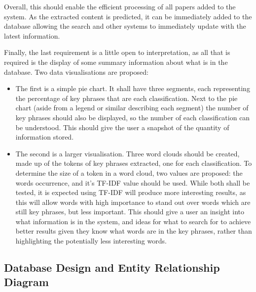 Overall, this should enable the efficient processing of all papers added to the system. As the extracted content is predicted, it can be immediately added to the database allowing the search and other systems to immediately update with the latest information.

Finally, the last requirement is a little open to interpretation, as all that is required is the display of some summary information about what is in the database. Two data visualisations are proposed:
\begin{itemize}
	\item The first is a simple pie chart. It shall have three segments, each representing the percentage of key phrases that are each classification. Next to the pie chart (aside from a legend or similar describing each segment) the number of key phrases should also be displayed, so the number of each classification can be understood. This should give the user a snapshot of the quantity of information stored.
	\item The second is a larger visualisation. Three word clouds should be created, made up of the tokens of key phrases extracted, one for each classification. To determine the size of a token in a word cloud, two values are proposed: the words occurrence, and it's TF-IDF value should be used. While both shall be tested, it is expected using TF-IDF will produce more interesting results, as this will allow words with high importance to stand out over words which are still key phrases, but less important. This should give a user an insight into what information is in the system, and ideas for what to search for to achieve better results given they know what words are in the key phrases, rather than highlighting the potentially less interesting words.
\end{itemize}

\subsection*{Database Design and Entity Relationship Diagram}

